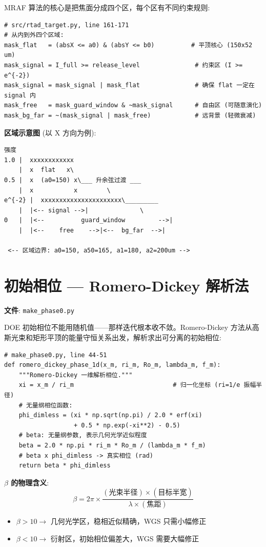 \documentclass[11pt,a4paper]{ctexart}
\begin{document}
MRAF 算法的核心是把焦面分成四个区，每个区有不同约束规则:

\begin{lstlisting}
# src/rtad_target.py, line 161-171
# 从内到外四个区域:
mask_flat   = (absX <= a0) & (absY <= b0)          # 平顶核心 (150x52 um)
mask_signal = I_full >= release_level               # 约束区 (I >= e^{-2})
mask_signal = mask_signal | mask_flat               # 确保 flat 一定在 signal 内
mask_free   = mask_guard_window & ~mask_signal      # 自由区 (可随意演化)
mask_bg_far = ~(mask_signal | mask_free)            # 远背景 (轻微衰减)
\end{lstlisting}

\textbf{区域示意图} (以 X 方向为例):

\begin{verbatim}
强度
1.0 |  xxxxxxxxxxxx
    |  x  flat   x\
0.5 |  x  (a0=150) x\___ 升余弦过渡 ___
    |  x           x        \
e^{-2} |  xxxxxxxxxxxxxxxxxxxxxx\_________
    |  |<-- signal -->|              \
0   |  |<--          guard_window         -->|
    |  |<--    free    -->|<--  bg_far  -->|

 <-- 区域边界: a0=150, a50=165, a1=180, a2=200um -->
\end{verbatim}

\section{初始相位 — Romero-Dickey 解析法}

\textbf{文件}: \texttt{make\_phase0.py}

DOE 初始相位不能用随机值——那样迭代根本收不敛。Romero-Dickey 方法从高斯光束和矩形平顶的能量守恒关系出发，解析求出可分离的初始相位:

\begin{lstlisting}
# make_phase0.py, line 44-51
def romero_dickey_phase_1d(x_m, ri_m, Ro_m, lambda_m, f_m):
    """Romero-Dickey 一维解析相位."""
    xi = x_m / ri_m                           # 归一化坐标 (ri=1/e 振幅半径)
    # 无量纲相位函数:
    phi_dimless = (xi * np.sqrt(np.pi) / 2.0 * erf(xi)
                   + 0.5 * np.exp(-xi**2) - 0.5)
    # beta: 无量纲参数, 表示几何光学近似程度
    beta = 2.0 * np.pi * ri_m * Ro_m / (lambda_m * f_m)
    # beta x phi_dimless -> 真实相位 (rad)
    return beta * phi_dimless
\end{lstlisting}

\textbf{$\beta$ 的物理含义}:
\[
\beta = 2\pi \times \frac{(\text{光束半径}) \times (\text{目标半宽})}{\lambda \times (\text{焦距})}
\]
\begin{itemize}[nosep]
  \item $\beta > 10 \rightarrow$ 几何光学区，稳相近似精确，WGS 只需小幅修正
  \item $\beta < 10 \rightarrow$ 衍射区，初始相位偏差大，WGS 需要大幅修正
\end{itemize}
\end{document}
